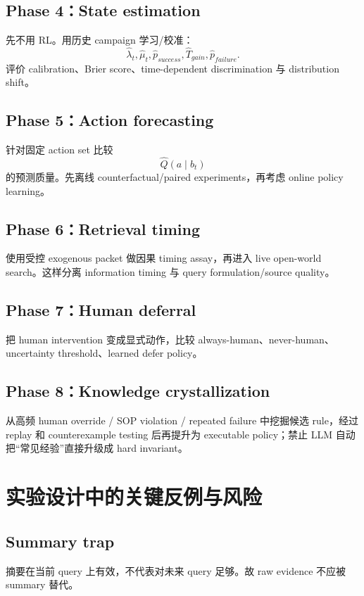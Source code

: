 \documentclass[11pt,a4paper]{ctexart}
\begin{document}
\subsection{Phase 4：State estimation}
先不用 RL。用历史 campaign 学习/校准：
\begin{equation}
 \hat\lambda_t,\hat\mu_t,\hat p_{success},\hat T_{gain},\hat p_{failure}.
\end{equation}
评价 calibration、Brier score、time-dependent discrimination 与 distribution shift。

\subsection{Phase 5：Action forecasting}
针对固定 action set 比较
\begin{equation}
 \hat Q(a\mid b_t)
\end{equation}
的预测质量。先离线 counterfactual/paired experiments，再考虑 online policy learning。

\subsection{Phase 6：Retrieval timing}
使用受控 exogenous packet 做因果 timing assay，再进入 live open-world search。这样分离 information timing 与 query formulation/source quality。

\subsection{Phase 7：Human deferral}
把 human intervention 变成显式动作，比较 always-human、never-human、uncertainty threshold、learned defer policy。

\subsection{Phase 8：Knowledge crystallization}
从高频 human override / SOP violation / repeated failure 中挖掘候选 rule，经过 replay 和 counterexample testing 后再提升为 executable policy；禁止 LLM 自动把“常见经验”直接升级成 hard invariant。

\section{实验设计中的关键反例与风险}

\subsection{Summary trap}
摘要在当前 query 上有效，不代表对未来 query 足够。故 raw evidence 不应被 summary 替代。
\end{document}
